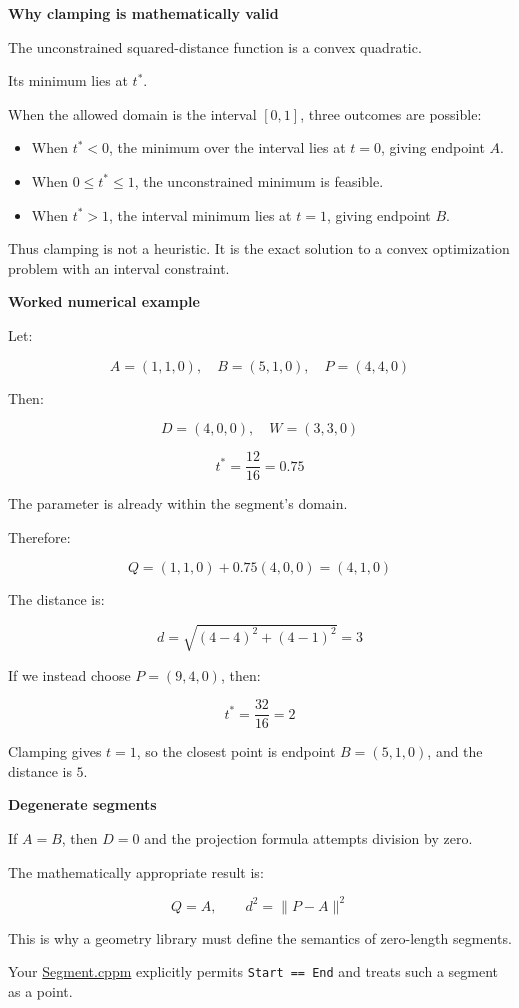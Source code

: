 \textbf{Why clamping is mathematically valid}

The unconstrained squared-distance function is a convex quadratic.

Its minimum lies at \(t^*\).

When the allowed domain is the interval \([0,1]\), three outcomes are possible:

\begin{itemize}
\tightlist
\item
  When \(t^*<0\), the minimum over the interval lies at \(t=0\), giving endpoint \(A\).
\item
  When \(0\le t^*\le1\), the unconstrained minimum is feasible.
\item
  When \(t^*>1\), the interval minimum lies at \(t=1\), giving endpoint \(B\).
\end{itemize}

Thus clamping is not a heuristic. It is the exact solution to a convex optimization problem with an interval constraint.

\textbf{Worked numerical example}

Let:

\[
A=(1,1,0),\quad B=(5,1,0),\quad P=(4,4,0)
\]

Then:

\[
D=(4,0,0),\quad W=(3,3,0)
\]

\[
t^*=\frac{12}{16}=0.75
\]

The parameter is already within the segment's domain.

Therefore:

\[
Q=(1,1,0)+0.75(4,0,0)=(4,1,0)
\]

The distance is:

\[
d=\sqrt{(4-4)^2+(4-1)^2}=3
\]

If we instead choose \(P=(9,4,0)\), then:

\[
t^*=\frac{32}{16}=2
\]

Clamping gives \(t=1\), so the closest point is endpoint \(B=(5,1,0)\), and the distance is \(5\).

\textbf{Degenerate segments}

If \(A=B\), then \(D=0\) and the projection formula attempts division by zero.

The mathematically appropriate result is:

\[
Q=A,\qquad d^2=\|P-A\|^2
\]

This is why a geometry library must define the semantics of zero-length segments.

Your \href{https://github.com/swayam8624/KairoGeometry/blob/master/Segment.cppm?utm_source=chatgpt.com}{Segment.cppm} explicitly permits \texttt{Start\ ==\ End} and treats such a segment as a point.

